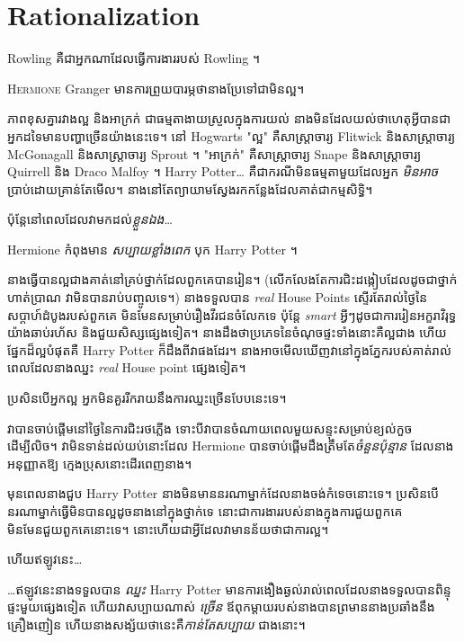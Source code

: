 \chapter{Rationalization}

\begin{chapterOpeningAuthorNote}
Rowling គឺជាអ្នកណាដែលធ្វើការងាររបស់ Rowling ។
\end{chapterOpeningAuthorNote}

\lettrine{H}{ermione} Granger មានការព្រួយបារម្ភថានាងប្រែទៅជាមិនល្អ។

\hplettrineextrapara
ភាពខុសគ្នារវាងល្អ និងអាក្រក់ ជាធម្មតាងាយស្រួលក្នុងការយល់ នាងមិនដែលយល់ថាហេតុអ្វីបានជាអ្នកដទៃមានបញ្ហាច្រើនយ៉ាងនេះទេ។ នៅ Hogwarts "ល្អ" គឺសាស្រ្តាចារ្យ Flitwick និងសាស្រ្តាចារ្យ McGonagall និងសាស្រ្តាចារ្យ Sprout ។ "អាក្រក់" គឺសាស្រ្តាចារ្យ Snape និងសាស្រ្តាចារ្យ Quirrell និង Draco Malfoy ។ Harry Potter… គឺជាករណីមិនធម្មតាមួយដែលអ្នក \emph{មិនអាច} ប្រាប់ដោយគ្រាន់តែមើល។ នាងនៅតែព្យាយាមស្វែងរកកន្លែងដែលគាត់ជាកម្មសិទ្ធិ។

ប៉ុន្តែនៅពេលដែលវាមកដល់\emph{ខ្លួនឯង}…

Hermione កំពុងមាន \emph{សប្បាយខ្លាំងពេក} បុក Harry Potter ។

នាង​ធ្វើ​បាន​ល្អ​ជាង​គាត់​នៅ​គ្រប់​ថ្នាក់​ដែល​ពួក​គេ​បាន​រៀន។ (លើក​លែង​តែ​ការ​ជិះ​ដង្កៀប​ដែល​ដូច​ជា​ថ្នាក់​ហាត់​ប្រាណ វា​មិន​បាន​រាប់​បញ្ចូល​ទេ។) នាង​ទទួល​បាន \emph{real} House Points ស្ទើរ​តែ​រាល់​ថ្ងៃ​នៃ​សប្តាហ៍​ដំបូង​របស់​ពួក​គេ មិន​មែន​សម្រាប់​រឿង​វីរជន​ចំលែក​ទេ ប៉ុន្តែ \emph{ smart} អ្វីៗដូចជាការរៀនអក្ខរាវិរុទ្ធយ៉ាងឆាប់រហ័ស និងជួយសិស្សផ្សេងទៀត។ នាងដឹងថាប្រភេទនៃចំណុចផ្ទះទាំងនោះគឺល្អជាង ហើយផ្នែកដ៏ល្អបំផុតគឺ Harry Potter ក៏ដឹងពីវាផងដែរ។ នាងអាចមើលឃើញវានៅក្នុងភ្នែករបស់គាត់រាល់ពេលដែលនាងឈ្នះ \emph{real} House point ផ្សេងទៀត។

ប្រសិនបើអ្នកល្អ អ្នកមិនគួររីករាយនឹងការឈ្នះច្រើនបែបនេះទេ។

វាបានចាប់ផ្តើមនៅថ្ងៃនៃការជិះរថភ្លើង ទោះបីវាបានចំណាយពេលមួយសន្ទុះសម្រាប់ខ្យល់កួចដើម្បីលិច។ វាមិនទាន់ដល់យប់នោះដែល Hermione បានចាប់ផ្តើមដឹងត្រឹមតែ\emph{ចំនួនប៉ុន្មាន} ដែលនាងអនុញ្ញាតឱ្យ ក្មេងប្រុសនោះដើរពេញនាង។

មុនពេលនាងជួប Harry Potter នាងមិនមាននរណាម្នាក់ដែលនាងចង់កំទេចនោះទេ។ ប្រសិនបើនរណាម្នាក់ធ្វើមិនបានល្អដូចនាងនៅក្នុងថ្នាក់ទេ នោះជាការងាររបស់នាងក្នុងការជួយពួកគេ មិនមែនជួយពួកគេនោះទេ។ នោះហើយជាអ្វីដែលវាមានន័យថាជាការល្អ។

ហើយឥឡូវនេះ…

…ឥឡូវនេះនាងទទួលបាន \emph{ឈ្នះ} Harry Potter មានការងឿងឆ្ងល់រាល់ពេលដែលនាងទទួលបានពិន្ទុផ្ទះមួយផ្សេងទៀត ហើយវាសប្បាយណាស់ \emph{ច្រើន} ឪពុកម្តាយរបស់នាងបានព្រមាននាងប្រឆាំងនឹងគ្រឿងញៀន ហើយនាងសង្ស័យថានេះគឺ\emph {កាន់តែសប្បាយ} ជាងនោះ។

